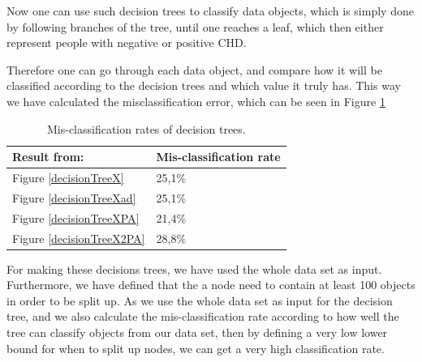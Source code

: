 Now one can use such decision trees to classify data objects, which is simply done by following branches of the tree, until one reaches a leaf, which then either represent people with negative or positive CHD.

Therefore one can go through each data object, and compare how it will be classified according to the decision trees and which value it truly has. This way we have calculated the misclassification error, which can be seen in Figure \ref{decisionTreeErrorRate}

\begin{table}
\begin{longtable}{|l|l|}
Result from: & Mis-classification rate \\ \hline
Figure \ref{decisionTreeX} & 25,1\% \\ \hline 
Figure \ref{decisionTreeXad} & 25,1\% \\ \hline
Figure \ref{decisionTreeXPA} & 21,4\% \\ \hline
Figure \ref{decisionTreeX2PA} & 28,8\% \\ \hline
\end{longtable}
\caption{Mis-classification rates of decision trees.}
\label{decisionTreeErrorRate}
\end{table}

For making these decisions trees, we have used the whole data set as input. Furthermore, we have defined that the a node need to contain at least 100 objects in order to be split up. As we use the whole data set as input for the decision tree, and we also calculate the mis-classification rate according to how well the tree can classify objects from our data set, then by defining a very low lower bound for when to split up nodes, we can get a very high classification rate.
